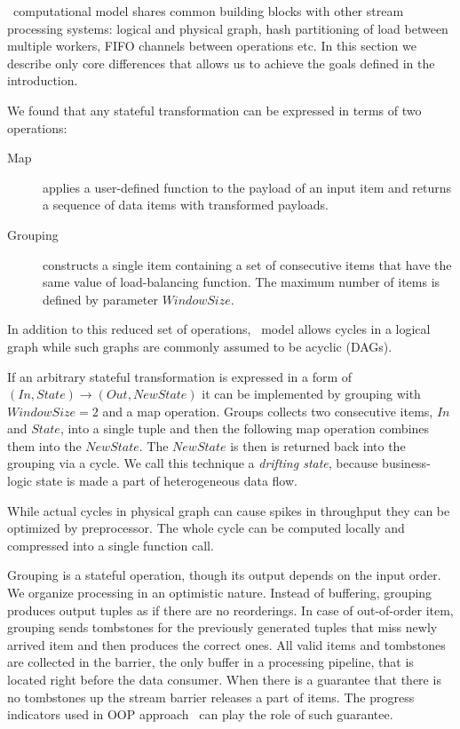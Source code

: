 \label {fs-short-model}

\FlameStream\ computational model shares common building blocks with other stream processing systems: logical and physical graph, hash partitioning of load between multiple workers, FIFO channels between operations etc. In this section we describe only core differences that allows us to achieve the goals defined in the introduction.

We found that any stateful transformation can be expressed in terms of two operations:

\begin {description}
  \item [Map] applies a user-defined function to the payload of an input item and returns a sequence of data items with transformed payloads. 
  \item [Grouping] constructs a single item containing a set of consecutive items that have the same value of load-balancing function. The maximum number of items is defined by parameter $Window Size$. 
\end {description}

In addition to this reduced set of operations, \FlameStream\ model allows cycles in a logical graph while such graphs are commonly assumed to be acyclic (DAGs).

If an arbitrary stateful transformation is expressed in a form of $(In, State) \rightarrow (Out, NewState)$ it can be implemented by grouping with $WindowSize = 2$ and a map operation. Groups collects two consecutive items, $In$ and $State$, into a single tuple and then the following map operation combines them into the $NewState$. The $NewState$ is then is returned back into the grouping via a cycle. We call this technique a {\it drifting state}, because business-logic state is made a part of heterogeneous data flow.

While actual cycles in physical graph can cause spikes in throughput they can be optimized by preprocessor. The whole cycle can be computed locally and compressed into a single function call.

Grouping is a stateful operation, though its output depends on the input order. We organize processing in an optimistic nature. Instead of buffering, grouping produces output tuples as if there are no reorderings. In case of out-of-order item, grouping sends tombstones for the previously generated tuples that miss newly arrived item and then produces the correct ones. All valid items and tombstones are collected in the barrier, the only buffer in a processing pipeline, that is located right before the data consumer. When there is a guarantee that there is no tombstones up the stream barrier releases a part of items. The progress indicators used in OOP approach~\cite{Li:2008:OPN:1453856.1453890} can play the role of such guarantee.
